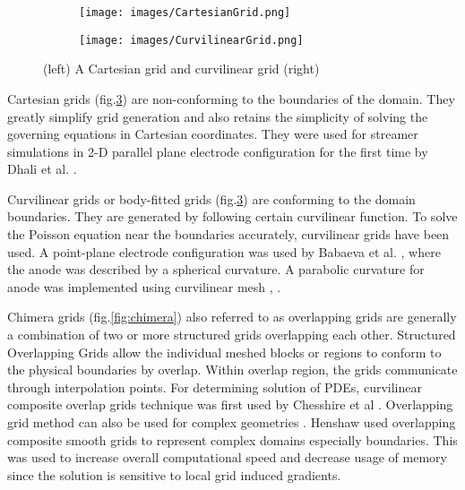 \documentclass[paper=a4, fontsize=13pt]{scrartcl}
\begin{document}
\begin{figure}[t!]
\centering
\begin{subfigure}
  \centering
  \texttt{[image: images/CartesianGrid.png]}
  \label{fig:cartesian grid}
\end{subfigure}%
\begin{subfigure}
  \centering
  \texttt{[image: images/CurvilinearGrid.png]}
  \label{fig:curvilinear grid}
\end{subfigure}
\caption{(left) A Cartesian grid \cite{Celestin2009TheGeometries} and curvilinear grid (right) \cite{Blazek2015ComputationalApplications}}
\label{fig:curvilinear grid}
\end{figure}

Cartesian grids (fig.\ref{fig:curvilinear grid}) are non-conforming to the boundaries of the domain. They greatly simplify grid generation and also retains the simplicity of solving the governing equations in Cartesian coordinates. They were used for streamer simulations in 2-D parallel plane electrode configuration for the first time by Dhali et al. \cite{Dhali1987TwodimensionalGases}. 


Curvilinear grids or body-fitted grids (fig.\ref{fig:curvilinear grid}) are conforming to the domain boundaries. They are generated by following certain curvilinear function. To solve the Poisson equation near the boundaries accurately, curvilinear grids have been used. A point-plane electrode configuration was used by Babaeva et al. \cite{Babaeva1996Two-dimensionalAir}, where the anode was described by a spherical curvature. A parabolic curvature for anode was implemented using curvilinear mesh \cite{Serdyuk2001TheField}, \cite{vanDijk2009ThePlasimo}.

Chimera grids (fig.\ref{fig:chimera}) also referred to as overlapping grids are generally a combination of two or more structured grids overlapping each other. Structured Overlapping Grids allow the individual meshed blocks or regions to conform to the physical boundaries by overlap. Within overlap region, the grids communicate through interpolation points. For determining solution of PDEs, curvilinear composite overlap grids technique was first used by Chesshire et al \cite{Chesshire1990CompositeEquations}. Overlapping grid method can also be used for complex geometries \cite{Baker1992MeshShapes}. Henshaw \cite{Henshaw2003AnGrids} used overlapping composite smooth grids to represent complex domains especially boundaries. This was used to increase overall computational speed and decrease usage of memory since the solution is sensitive to local grid induced gradients. 
\end{document}
